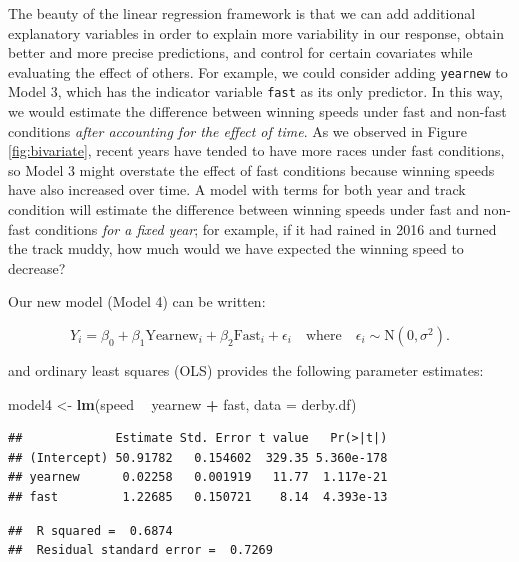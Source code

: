 \documentclass[
]{krantz}
\newenvironment{Shaded}{\begin{snugshade}}{\end{snugshade}}
\newcommand{\DataTypeTok}[1]{\textcolor[rgb]{0.27,0.27,0.27}{#1}}
\newcommand{\KeywordTok}[1]{\textcolor[rgb]{0.27,0.27,0.27}{\textbf{#1}}}
\newcommand{\NormalTok}[1]{#1}
\newcommand{\OperatorTok}[1]{\textcolor[rgb]{0.43,0.43,0.43}{\textbf{#1}}}
\newcommand{\StringTok}[1]{\textcolor[rgb]{0.5,0.5,0.5}{#1}}
\begin{document}
The beauty of the linear regression framework is that we can add additional explanatory variables in order to explain more variability in our response, obtain better and more precise predictions, and control for certain covariates while evaluating the effect of others. For example, we could consider adding \texttt{yearnew} to Model 3, which has the indicator variable \texttt{fast} as its only predictor. In this way, we would estimate the difference between winning speeds under fast and non-fast conditions \emph{after accounting for the effect of time}. As we observed in Figure \ref{fig:bivariate}, recent years have tended to have more races under fast conditions, so Model 3 might overstate the effect of fast conditions because winning speeds have also increased over time. A model with terms for both year and track condition will estimate the difference between winning speeds under fast and non-fast conditions \emph{for a fixed year}; for example, if it had rained in 2016 and turned the track muddy, how much would we have expected the winning speed to decrease?

Our new model (Model 4) can be written:

\begin{equation}
Y_{i}=\beta_{0}+\beta_{1}\textrm{Yearnew}_{i}+\beta_{2}\textrm{Fast}_{i}+\epsilon_{i}\quad \textrm{where}\quad \epsilon_{i}\sim \textrm{N}(0,\sigma^2).
\label{eq:model4}
\end{equation}

and ordinary least squares (OLS) provides the following parameter estimates:

\begin{Shaded}
\begin{Highlighting}[]
\NormalTok{model4 <-}\StringTok{ }\KeywordTok{lm}\NormalTok{(speed }\OperatorTok{~}\StringTok{ }\NormalTok{yearnew }\OperatorTok{+}\StringTok{ }\NormalTok{fast, }\DataTypeTok{data =}\NormalTok{ derby.df)}
\end{Highlighting}
\end{Shaded}

\begin{verbatim}
##             Estimate Std. Error t value   Pr(>|t|)
## (Intercept) 50.91782   0.154602  329.35 5.360e-178
## yearnew      0.02258   0.001919   11.77  1.117e-21
## fast         1.22685   0.150721    8.14  4.393e-13
\end{verbatim}

\begin{verbatim}
##  R squared =  0.6874 
##  Residual standard error =  0.7269
\end{verbatim}
\end{document}

